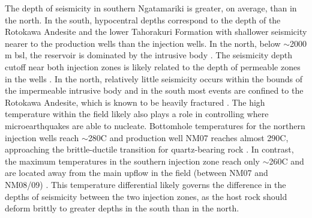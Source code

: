 The depth of seismicity in southern Ngatamariki is greater, on average, than in the north. In the south, hypocentral depths correspond to the depth of the Rotokawa Andesite and the lower Tahorakuri Formation \citep{Chambefort_2014} with shallower seismicity nearer to the production wells than the injection wells. In the north, below $\sim$2000 m bsl, the reservoir is dominated by the intrusive body \citep{Chambefort_2014}. The seismicity depth cutoff near both injection zones is likely related to the depth of permeable zones in the wells \citep{massiot_2012,nm09_report,nm10_report}. In the north, relatively little seismicity occurs within the bounds of the impermeable intrusive body and in the south most events are confined to the Rotokawa Andesite, which is known to be heavily fractured \citep{nm10_report}. The high temperature within the field likely also plays a role in controlling where microearthquakes are able to nucleate. Bottomhole temperatures for the northern injection wells reach $\sim$280\textdegree C and production well NM07 reaches almost 290\textdegree C, approaching the brittle-ductile transition for quartz-bearing rock \citep{Scholz_1988}. In contrast, the maximum temperatures in the southern injection zone reach only $\sim$260\textdegree C and are located away from the main upflow in the field (between NM07 and NM08/09) \citep{Chambefort_2016}. This temperature differential likely governs the difference in the depths of seismicity between the two injection zones, as the host rock should deform brittly to greater depths in the south than in the north.

